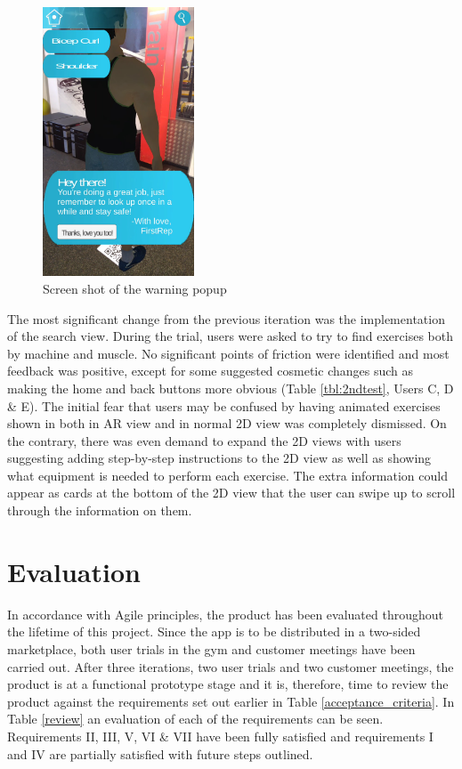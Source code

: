 \documentclass{l4proj}
\begin{document}
\begin{figure}
\centering
\includegraphics[height=8cm]{images/popup.png}
\caption{Screen shot of the warning popup} 
\label{fig:popup}
\end{figure}



The most significant change from the previous iteration was the implementation of the search view. During the trial, users were asked to try to find exercises both by machine and muscle. No significant points of friction were identified and most feedback was positive, except for some suggested cosmetic changes such as making the home and back buttons more obvious (Table \ref{tbl:2ndtest}, Users C, D \& E). The initial fear that users may be confused by having animated exercises shown in both in AR view and in normal 2D view was completely dismissed. On the contrary, there was even demand to expand the 2D views with users suggesting adding step-by-step instructions to the 2D view as well as showing what equipment is needed to perform each exercise. The extra information could appear as cards at the bottom of the 2D view that the user can swipe up to scroll through the information on them.


\chapter{Evaluation}
\label{chapter:eval}
In accordance with Agile principles, the product has been evaluated throughout the lifetime of this project. Since the app is to be distributed in a two-sided marketplace, both user trials in the gym and customer meetings have been carried out. After three iterations, two user trials and two customer meetings, the product is at a functional prototype stage and it is, therefore, time to review the product against the requirements set out earlier in Table \ref{acceptance_criteria}. In Table \ref{review} an evaluation of each of the requirements can be seen. Requirements II, III, V, VI \& VII have been fully satisfied and requirements I and IV are partially satisfied with future steps outlined. 
\end{document}
